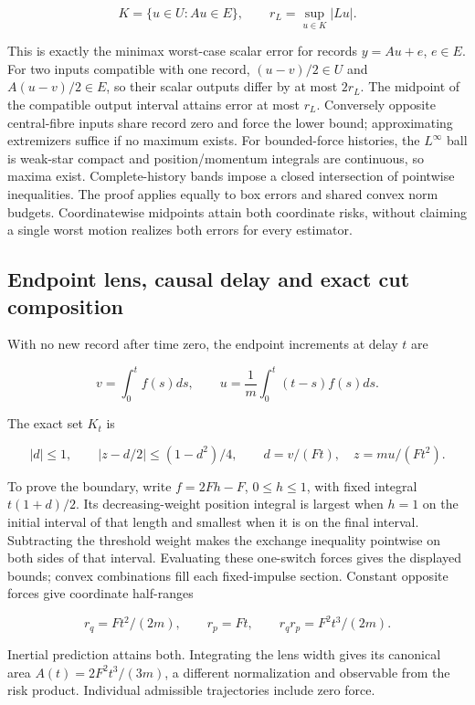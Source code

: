 \documentclass[11pt,a4paper]{article}
\begin{document}
\[K=\{u\in U:Au\in E\},\qquad r_L=\sup_{u\in K}|Lu|.\]

This is exactly the minimax worst-case scalar error for records
\(y=Au+e\), \(e\in E\). For two inputs compatible with one record,
\((u-v)/2\in U\) and \(A(u-v)/2\in E\), so their scalar outputs differ
by at most \(2r_L\). The midpoint of the compatible output interval
attains error at most \(r_L\). Conversely opposite central-fibre inputs
share record zero and force the lower bound; approximating extremizers
suffice if no maximum exists. For bounded-force histories, the
\(L^\infty\) ball is weak-star compact and position/momentum integrals
are continuous, so maxima exist. Complete-history bands impose a closed
intersection of pointwise inequalities. The proof applies equally to box
errors and shared convex norm budgets. Coordinatewise midpoints attain
both coordinate risks, without claiming a single worst motion realizes
both errors for every estimator.

\hypertarget{endpoint-lens-causal-delay-and-exact-cut-composition}{%
\subsection{Endpoint lens, causal delay and exact cut
composition}\label{endpoint-lens-causal-delay-and-exact-cut-composition}}

With no new record after time zero, the endpoint increments at delay
\(t\) are

\[v=\int_0^t f(s)ds,\qquad
u=\frac1m\int_0^t(t-s)f(s)ds.\]

The exact set \(K_t\) is

\[|d|\le1,\qquad |z-d/2|\le(1-d^2)/4,
\qquad d=v/(Ft),\quad z=mu/(Ft^2).\]

To prove the boundary, write \(f=2Fh-F\), \(0\le h\le1\), with fixed
integral \(t(1+d)/2\). Its decreasing-weight position integral is
largest when \(h=1\) on the initial interval of that length and smallest
when it is on the final interval. Subtracting the threshold weight makes
the exchange inequality pointwise on both sides of that interval.
Evaluating these one-switch forces gives the displayed bounds; convex
combinations fill each fixed-impulse section. Constant opposite forces
give coordinate half-ranges

\[r_q=Ft^2/(2m),\qquad r_p=Ft,\qquad r_qr_p=F^2t^3/(2m).\]

Inertial prediction attains both. Integrating the lens width gives its
canonical area \(A(t)=2F^2t^3/(3m)\), a different normalization and
observable from the risk product. Individual admissible trajectories
include zero force.
\end{document}
